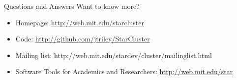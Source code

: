 \begin{frame}{Questions and Answers}
  Want to know more?
  \begin{itemize}
    \item Homepage: \url{http://web.mit.edu/starcluster}
    \item Code: \url{http://github.com/jtriley/StarCluster}
    \item Mailing list: \linebreak http://web.mit.edu/stardev/cluster/mailinglist.html
    \item Software Tools for Academics and Researchers: \url{http://web.mit.edu/star}
  \end{itemize}
\end{frame}
